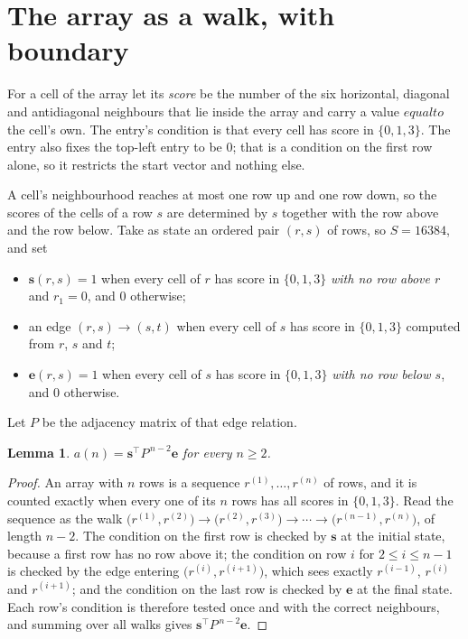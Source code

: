 \documentclass[11pt,a4paper]{article}
\theoremstyle{plain}
\newtheorem{lemma}[theorem]{Lemma}
\theoremstyle{definition}
\begin{document}
\section{The array as a walk, with boundary}

For a cell of the array let its \emph{score} be the number of the six horizontal, diagonal and antidiagonal neighbours that lie inside
the array and carry a value $equal to$ the cell's own. The entry's condition is that every cell
has score in $\{0,1,3\}$. The entry also fixes the top-left entry to be $0$; that is a condition on the first row alone, so it restricts the start vector and nothing else.

A cell's neighbourhood reaches at most one row up and one row down, so the scores of the
cells of a row $s$ are determined by $s$ together with the row above and the row below.
Take as state an ordered pair $(r,s)$ of rows, so $S=16384$, and set
\begin{itemize}
\item $\mathbf{s}(r,s)=1$ when every cell of $r$ has score in $\{0,1,3\}$ \emph{with no row
above $r$} and $r_1=0$, and $0$ otherwise;
\item an edge $(r,s)\to(s,t)$ when every cell of $s$ has score in $\{0,1,3\}$ computed from
$r$, $s$ and $t$;
\item $\mathbf{e}(r,s)=1$ when every cell of $s$ has score in $\{0,1,3\}$ \emph{with no row
below $s$}, and $0$ otherwise.
\end{itemize}
Let $P$ be the adjacency matrix of that edge relation.

\begin{lemma}\label{lem:walk}
$a(n)=\mathbf{s}^{\!\top}P^{\,n-2}\mathbf{e}$ for every $n\ge2$.
\end{lemma}

\begin{proof}
An array with $n$ rows is a sequence $r^{(1)},\dots,r^{(n)}$ of rows, and it is counted
exactly when every one of its $n$ rows has all scores in $\{0,1,3\}$. Read the sequence as the
walk $\bigl(r^{(1)},r^{(2)}\bigr)\to\bigl(r^{(2)},r^{(3)}\bigr)\to\cdots\to
\bigl(r^{(n-1)},r^{(n)}\bigr)$, of length $n-2$. The condition on the first row is
checked by $\mathbf{s}$ at the initial state, because a first row has no row above it; the
condition on row $i$ for $2\le i\le n-1$ is checked by the edge entering
$\bigl(r^{(i)},r^{(i+1)}\bigr)$, which sees exactly $r^{(i-1)}$, $r^{(i)}$ and
$r^{(i+1)}$; and the condition on the last row is checked by $\mathbf{e}$ at the final
state. Each row's condition is therefore tested once and with the correct neighbours, and
summing over all walks gives $\mathbf{s}^{\!\top}P^{\,n-2}\mathbf{e}$.
\end{proof}
\end{document}
